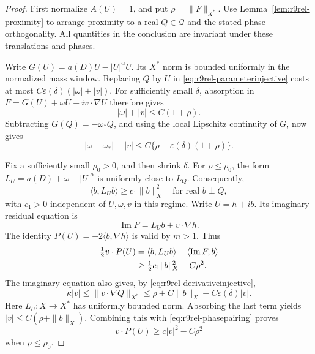 \begin{proof}
First normalize $A(U)=1$, and put $\rho=\|F\|_{X^*}$.
Use Lemma~\ref{lem:r9rel-proximity} to arrange proximity to a real
$Q\in\mathcal Q$ and the stated phase orthogonality. All quantities
in the conclusion are invariant under these translations and phases.

Write $G(U)=a(D)U-|U|^\alpha U$. Its $X^*$ norm is bounded uniformly
in the normalized mass window. Replacing $Q$ by $U$ in
\eqref{eq:r9rel-parameterinjective} costs at most
$C\varepsilon(\delta)(|\omega|+|v|)$.
For sufficiently small $\delta$, absorption in
$F=G(U)+\omega U+iv\cdot\nabla U$ therefore gives
\begin{equation}\label{eq:r9rel-parameterbound}
 |\omega|+|v|\le C(1+\rho).
\end{equation}
Subtracting $G(Q)=-\omega_*Q$, and using the local Lipschitz
continuity of $G$, now gives
\begin{equation}\label{eq:r9rel-parametersmall}
 |\omega-\omega_*|+|v|
 \le C\{\rho+\varepsilon(\delta)(1+\rho)\}.
\end{equation}

Fix a sufficiently small $\rho_0>0$, and then shrink $\delta$.
For $\rho\le\rho_0$, the form
$L_U=a(D)+\omega-|U|^\alpha$ is uniformly close to $L_Q$.
Consequently,
\begin{equation}\label{eq:r9rel-perturbedcoercivity}
 \langle b,L_Ub\rangle\ge c_1\|b\|_X^2
 \quad\text{for real }b\perp Q,
\end{equation}
with $c_1>0$ independent of $U,\omega,v$ in this regime.
Write $U=h+ib$. Its imaginary residual equation is
\[
 \operatorname{Im}F=L_Ub+v\cdot\nabla h.
\]
The identity $P(U)=-2\langle b,\nabla h\rangle$ is valid by $m>1$.
Thus
\begin{align}
 \tfrac12v\cdot P(U)
 &=\langle b,L_Ub\rangle-\langle\operatorname{Im}F,b\rangle
 \notag\\
 &\ge\tfrac12c_1\|b\|_X^2-C\rho^2.
 \label{eq:r9rel-phasepairing}
\end{align}
The imaginary equation also gives, by
\eqref{eq:r9rel-derivativeinjective},
\[
 \kappa|v|\le\|v\cdot\nabla Q\|_{X^*}
 \le\rho+C\|b\|_X+C\varepsilon(\delta)|v|.
\]
Here $L_U:X\to X^*$ has uniformly bounded norm.
Absorbing the last term yields
$|v|\le C(\rho+\|b\|_X)$. Combining this with
\eqref{eq:r9rel-phasepairing} proves
\begin{equation}\label{eq:r9rel-normalized}
 v\cdot P(U)\ge c|v|^2-C\rho^2
\end{equation}
when $\rho\le\rho_0$.


\end{proof}
